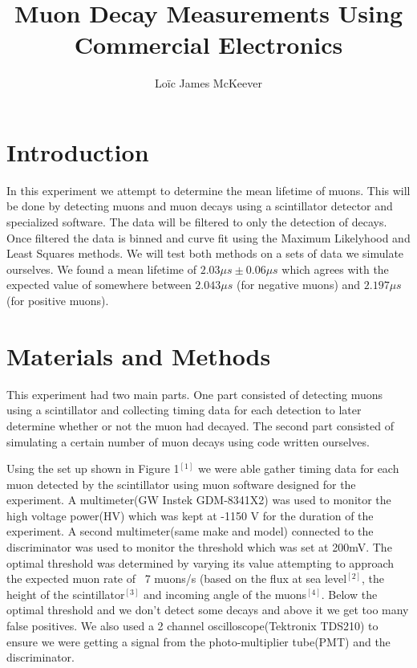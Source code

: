 \documentclass{article}
\begin{document}
\title{Muon Decay Measurements Using Commercial Electronics}
\author{Loïc James McKeever}

\maketitle

\section{Introduction}

In this experiment we attempt to determine the mean lifetime of muons.  This will be done by detecting muons and muon decays using a scintillator detector and specialized software.  The data will be filtered to only the detection of decays. Once filtered the data is binned and curve fit using the Maximum Likelyhood and Least Squares methods.  We will test both methods on a sets of data we simulate ourselves.  We found a mean lifetime of $2.03 \mu s \pm 0.06 \mu s$ which agrees with the expected value of somewhere between $2.043 \mu s$ (for negative muons) and $2.197 \mu s$ (for positive muons).   

\section{Materials and Methods}

This experiment had two main parts.  One part consisted of detecting muons using a scintillator and collecting timing data for each detection to later determine whether or not the muon had decayed.  The second part consisted of simulating a certain number of muon decays using code written ourselves.

Using the set up shown in Figure 1$^{[1]}$ we were able gather timing data for each muon detected by the scintillator using muon software designed for the experiment.  A multimeter(GW Instek GDM-8341X2) was used to monitor the high voltage power(HV) which was kept at -1150 V for the duration of the experiment.  A second multimeter(same make and model) connected to the discriminator was used to monitor the threshold which was set at 200mV.  The optimal threshold was determined by varying its value attempting to approach the expected muon rate of ~7 muons/s (based on the flux at sea level$^{[2]}$, the height of the scintillator$^{[3]}$ and incoming angle of the muons$^{[4]}$.  Below the optimal threshold and we don't detect some decays and above it we get too many false positives.  We also used a 2 channel oscilloscope(Tektronix TDS210) to ensure we were getting a signal from the photo-multiplier tube(PMT) and the discriminator.  
\end{document}

